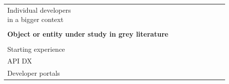 \documentclass[english, 12pt, a4paper, sci, utf8, a-1b, online]{aaltothesis}
\begin{document}
{\begin{center}
\begin{longtable}{p{0.3\linewidth}p{0.6\linewidth}}
      Individual developers in a bigger context  & \textcite{entering-an-ecosystem} \newline \textcite{fagerholm2014examining}                                                                                                                                                                                                                           \\
                                                &                                                                                                                                                                                                                                                                                                       \\
      \multicolumn{2}{l}{\textbf{Object or entity under study in grey literature}}                                                                                                                                                                                                                                                                                                                           \\
      \hline                                                                                                                                                                                                                                                                                                                                             \\
      Starting experience                        & \textcite{what-is-developer-experience-everydeveloper}                                                                                                                                                                                                                                                \\
      API DX                                     & \textcite{great-dx-and-the-people-who-make-them}                                                                                                                                                                                                                                                      \\
      Developer portals                          & \textcite{apis-for-humans-the-rise-of-developer-experience} \newline \textcite{4-apis-doing-developer-experience-really-well} \newline \textcite{what-is-api-developer-experience-and-why-it-matters}                                                                                                 \\

\end{longtable}
\end{center}}
\end{document}
